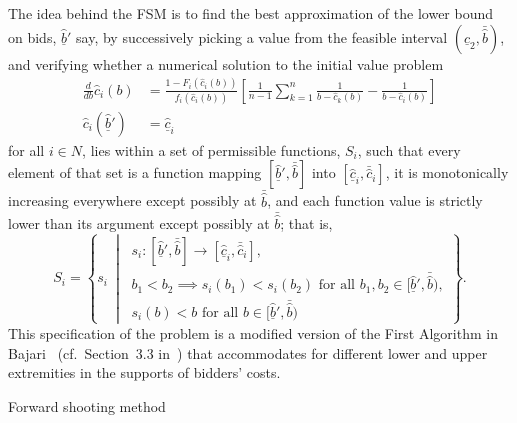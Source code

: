 The idea behind the FSM is to find the best approximation of the lower bound on bids, $\underline{\hat{b}}'$ say, by successively picking a value from the feasible interval $(\underline{\hat{c}}_2, \bar{\hat{b}})$, and verifying whether a numerical solution to the initial value problem
\begin{equation}
  \label{eq:fsm_initial_value_problem_indirect}
  \begin{array}{ll}
    \displaystyle\frac{d}{db}\hat{c}_i(b) &= \displaystyle\frac{1 - F_i(\hat{c}_i(b))}{f_i(\hat{c}_i(b))}\left[ \frac{1}{n-1}\sum_{k=1}^n\frac{1}{b - \hat{c}_k(b)} - \frac{1}{b - \hat{c}_i(b)} \right] \\[2ex]
    \hat{c}_i(\underline{\hat{b}}') &= \underline{\hat{c}}_i
  \end{array}
\end{equation}
for all $i\in N$, lies within a set of permissible functions, $S_i$, such that every element of that set is a function mapping $[\underline{\hat{b}}', \bar{\hat{b}}]$ into $[\underline{\hat{c}}_i, \bar{\hat{c}}_i]$, it is monotonically increasing everywhere except possibly at $\bar{\hat{b}}$, and each function value is strictly lower than its argument except possibly at $\bar{\hat{b}}$; that is,
\begin{equation*}
  S_i=\left\{s_i \:\middle\vert\:
  \begin{array}{l}
    s_i: [\underline{\hat{b}}', \bar{\hat{b}}]\to [\underline{\hat{c}}_i, \bar{\hat{c}}_i],\\
    b_1 < b_2\implies s_i(b_1) < s_i(b_2) \textrm{ for all }b_1,b_2\in [\underline{\hat{b}}', \bar{\hat{b}}),\\
    s_i(b) < b \textrm{ for all }b\in [\underline{\hat{b}}', \bar{\hat{b}})
  \end{array}
  \right\}.
\end{equation*}
This specification of the problem is a modified version of the First Algorithm in Bajari~\cite{Bajari2001a} (cf.~Section~3.3 in~\cite{Bajari2001a}) that accommodates for different lower and upper extremities in the supports of bidders' costs.

\begin{algorithm}
\caption{Forward shooting method}
\label{alg:forward_shooting_method_indirect}
\begin{algorithmic}[1]
  \Statex
  \Statex
    \Let{$bids$}{$[guess, \bar{\hat{b}})$}
    \Else
    \EndIf
  \EndWhile
  \Statex
\end{algorithmic}
\end{algorithm}

